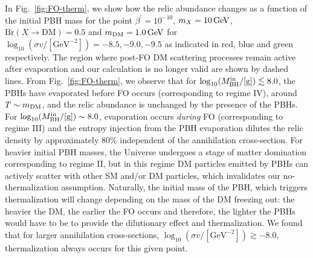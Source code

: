 \documentclass[aps,prd,reprint,twocolumn,preprintnumbers,floatfix,nofootinbib]{revtex4-1}
\newcommand{\mDM}{m_{\rm DM}}
\newcommand{\MBH}{M_{\rm BH}}
\newcommand{\figref}[1]{Fig.~\ref{#1}}
\begin{document}
In \figref{fig:FO-therm}, we show how the relic abundance changes as a function of the initial PBH mass for  the point $\beta^\prime = 10^{-10}$, $m_X = 10\,\rm{GeV}$, $\mathrm{Br}(X\to \mathrm{DM}) = 0.5$ and  $\mDM = 1.0\, \rm{GeV}$  for $\log_{10}(\sigma v/[\text{GeV}^{-2}]) = -8.5, -9.0, -9.5$  as indicated in red,  blue and green respectively. The region where post-FO DM scattering processes remain active after evaporation and our calculation is no longer valid are shown by dashed lines. From \figref{fig:FO-therm},  we observe that for  $\log_{10}(\MBH^{\rm in}/[\rm{g}]) \lesssim 8.0$, the PBHs have evaporated before FO occurs (corresponding to regime IV), around $T\sim \mDM$, and the relic abundance is unchanged by the presence of the PBHs.  For $\log_{10}(\MBH^{\rm in}/[\rm{g}]) \sim 8.0$, evaporation occurs \emph{during} FO (corresponding to regime III) and the entropy injection from the PBH evaporation dilutes  the relic density by approximately $80\%$ independent of the annihilation cross-section. For heavier initial PBH masses, the Universe undergoes a stage of matter domination corresponding to regime II, but in this regime DM particles emitted by PBHs can actively scatter with other SM and/or DM particles, which invalidates our no-thermalization assumption. Naturally, the initial mass of the PBH, which triggers thermalization will change depending on the mass of the DM freezing out: the heavier the DM,  the earlier the FO occurs and therefore, the lighter the PBHs would have to be to provide the dilutionary effect and thermalization.
We found that for larger annihilation cross-sections, $\log_{10}(\sigma v/[\text{GeV}^{-2}]) \gtrsim -8.0$,  thermalization always occurs for this given point.   
\end{document}
